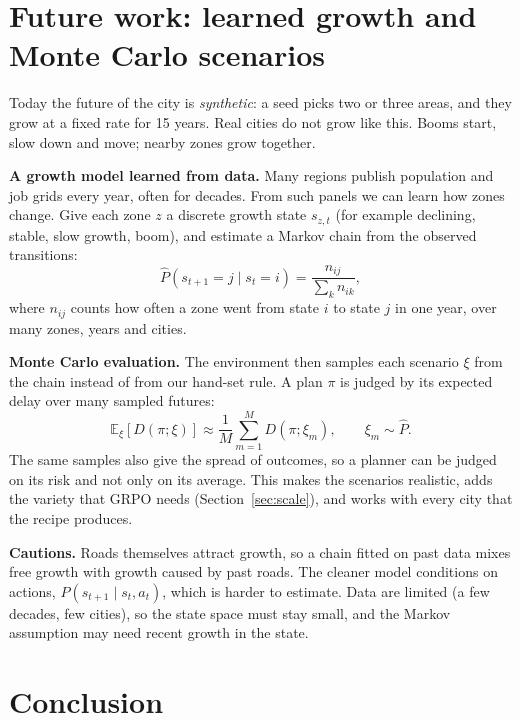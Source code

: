 \documentclass{article}
\begin{document}
\section{Future work: learned growth and Monte Carlo scenarios}\label{sec:future}

Today the future of the city is \emph{synthetic}: a seed picks two or three areas, and they grow at a fixed rate for 15 years. Real cities do not grow like this. Booms start, slow down and move; nearby zones grow together.

\textbf{A growth model learned from data.} Many regions publish population and job grids every year, often for decades. From such panels we can learn how zones change. Give each zone $z$ a discrete growth state $s_{z,t}$ (for example declining, stable, slow growth, boom), and estimate a Markov chain from the observed transitions:
\begin{equation}
\hat P(s_{t+1}=j\mid s_t=i)=\frac{n_{ij}}{\sum_{k}n_{ik}},
\end{equation}
where $n_{ij}$ counts how often a zone went from state $i$ to state $j$ in one year, over many zones, years and cities.

\textbf{Monte Carlo evaluation.} The environment then samples each scenario $\xi$ from the chain instead of from our hand-set rule. A plan $\pi$ is judged by its expected delay over many sampled futures:
\begin{equation}
\mathbb{E}_{\xi}\!\left[D(\pi;\xi)\right]\approx\frac{1}{M}\sum_{m=1}^{M}D(\pi;\xi_m),\qquad \xi_m\sim\hat P .
\end{equation}
The same samples also give the spread of outcomes, so a planner can be judged on its risk and not only on its average. This makes the scenarios realistic, adds the variety that GRPO needs (Section~\ref{sec:scale}), and works with every city that the recipe produces.

\textbf{Cautions.} Roads themselves attract growth, so a chain fitted on past data mixes free growth with growth caused by past roads. The cleaner model conditions on actions, $P(s_{t+1}\mid s_t,a_t)$, which is harder to estimate. Data are limited (a few decades, few cities), so the state space must stay small, and the Markov assumption may need recent growth in the state.

\section{Conclusion}
\end{document}
